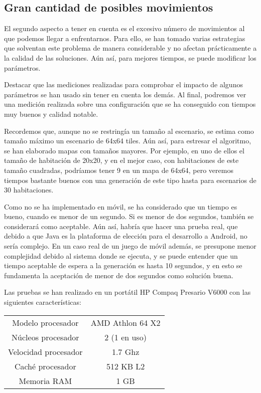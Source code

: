 \subsection{Gran cantidad de posibles movimientos}

El segundo aspecto a tener en cuenta es el excesivo número de movimientos al que podemos llegar a enfrentarnos. Para ello, se han tomado varias estrategias que solventan este problema de manera considerable y no afectan prácticamente a la calidad de las soluciones. Aún así, para mejores tiempos, se puede modificar los parámetros.

Destacar que las mediciones realizadas para comprobar el impacto de algunos parámetros se han usado sin tener en cuenta los demás. Al final, podremos ver una medición realizada sobre una configuración que se ha conseguido con tiempos muy buenos y calidad notable.

Recordemos que, aunque no se restringía un tamaño al escenario, se estima como tamaño máximo un escenario de 64x64 tiles. Aún así, para estresar el algoritmo, se han elaborado mapas con tamaños mayores. Por ejemplo, en uno de ellos el tamaño de habitación de 20x20, y en el mejor caso, con habitaciones de este tamaño cuadradas, podríamos tener 9 en un mapa de 64x64, pero veremos tiempos bastante buenos con una generación de este tipo hasta para escenarios de 30 habitaciones.

Como no se ha implementado en móvil, se ha considerado que un tiempo es bueno, cuando es menor de un segundo. Si es menor de dos segundos, también se considerará como aceptable. Aún así, habría que hacer una prueba real, que debido a que Java es la plataforma de elección para el desarrollo a Android, no sería complejo. En un caso real de un juego de móvil además, se presupone menor complejidad debido al sistema donde se ejecuta, y se puede entender que un tiempo aceptable de espera a la generación es hasta 10 segundos, y en esto se fundamenta la aceptación de menor de dos segundos como solución buena.

Las pruebas se han realizado en un portátil HP Compaq Presario V6000 con las siguientes características:

\begin{center}
	\begin{tabular}{ | c | c | }
\hline
Modelo procesador & AMD Athlon 64 X2 \\ 
Núcleos procesador & 2 (1 en uso) \\
Velocidad procesador & 1.7 Ghz \\
Caché procesador & 512 KB L2 \\
Memoria RAM & 1 GB \\
\hline
	\end{tabular}
\end{center}


